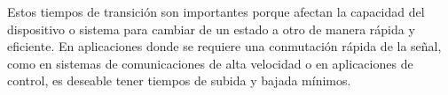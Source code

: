 \documentclass[12pt,fleqn,a4paper,oneside]{LegrandOrangeBook}
\begin{document}
\begin{remark}
Estos tiempos de transición son importantes porque afectan la capacidad del dispositivo o sistema para cambiar de un estado a otro de manera rápida y eficiente. En aplicaciones donde se requiere una conmutación rápida de la señal, como en sistemas de comunicaciones de alta velocidad o en aplicaciones de control, es deseable tener tiempos de subida y bajada mínimos.
\end{remark}
\end{document}
